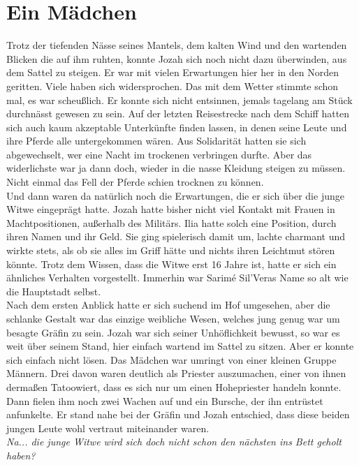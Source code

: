 \chapter{Ein Mädchen}

Trotz der tiefenden Nässe seines Mantels, dem kalten Wind und den wartenden Blicken die auf ihm 
ruhten, konnte Jozah sich noch nicht dazu überwinden, aus dem Sattel zu steigen. Er war mit vielen 
Erwartungen hier her in den Norden geritten. Viele haben sich widersprochen. Das mit dem Wetter 
stimmte schon mal, es war scheußlich. Er konnte sich nicht entsinnen, jemals tagelang am Stück 
durchnässt gewesen zu sein. Auf der letzten Reisestrecke nach dem Schiff hatten sich auch kaum 
akzeptable Unterkünfte finden lassen, in denen seine Leute und ihre Pferde alle untergekommen 
wären. Aus Solidarität hatten sie sich abgewechselt, wer eine Nacht im trockenen verbringen durfte. 
Aber das widerlichste war ja dann doch, wieder in die nasse Kleidung steigen zu müssen. Nicht 
einmal das Fell der Pferde schien trocknen zu können.\\
Und dann waren da natürlich noch die Erwartungen, die er sich über die junge Witwe eingeprägt 
hatte. Jozah hatte bisher nicht viel Kontakt mit Frauen in Machtpositionen, außerhalb des Militärs. 
Ilia hatte solch eine Position, durch ihren Namen und ihr Geld. Sie ging spielerisch damit um, 
lachte charmant und wirkte stets, als ob sie alles im Griff hätte und nichts ihren Leichtmut stören 
könnte. Trotz dem Wissen, dass die Witwe erst 16 Jahre ist, hatte er sich ein ähnliches Verhalten 
vorgestellt. Immerhin war Sarimé Sil'Veras Name so alt wie die Hauptstadt selbst.\\
Nach dem ersten Anblick hatte er sich suchend im Hof umgesehen, aber die schlanke Gestalt war das 
einzige weibliche Wesen, welches jung genug war um besagte Gräfin zu sein. Jozah war sich seiner 
Unhöflichkeit bewusst, so war es weit über seinem Stand, hier einfach wartend im Sattel zu sitzen. 
Aber er konnte sich einfach nicht lösen. Das Mädchen war umringt von einer kleinen Gruppe Männern. 
Drei davon waren deutlich als Priester auszumachen, einer von ihnen dermaßen Tatoowiert, dass es 
sich nur um einen Hohepriester handeln konnte. Dann fielen ihm noch zwei Wachen auf und ein 
Bursche, der ihn entrüstet anfunkelte. Er stand nahe bei der Gräfin und Jozah entschied, dass diese 
beiden jungen Leute wohl vertraut miteinander waren.\\
\textit{Na... die junge Witwe wird sich doch nicht schon den nächsten ins Bett geholt haben?}\\
